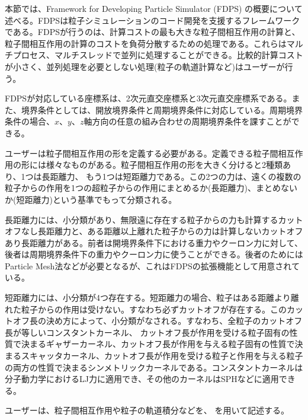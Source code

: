 
本節では、Framework for Developing Particle Simulator (FDPS)
の概要について述べる。FDPSは粒子シミュレーションのコード開発を支援するフレームワークである。FDPSが行うのは、計算コストの最も大きな粒子間相互作用の計算と、粒子間相互作用の計算のコストを負荷分散するための処理である。これらはマルチプロセス、マルチスレッドで並列に処理することができる。比較的計算コストが小さく、並列処理を必要としない処理(粒子の軌道計算など)はユーザーが行う。

FDPSが対応している座標系は、2次元直交座標系と3次元直交座標系である。また、境界条件としては、開放境界条件と周期境界条件に対応している。周期境界条件の場合、$x$、$y$、$z$軸方向の任意の組み合わせの周期境界条件を課すことができる。

ユーザーは粒子間相互作用の形を定義する必要がある。定義できる粒子間相互作用の形には様々なものがある。粒子間相互作用の形を大きく分けると2種類あり、1つは長距離力、 もう1つは短距離力である。この2つの力は、遠くの複数の粒子からの作用を1つの超粒子からの作用にまとめるか(長距離力)、まとめないか(短距離力)という基準でもって分類される。

長距離力には、小分類があり、無限遠に存在する粒子からの力も計算するカットオフなし長距離力と、ある距離以上離れた粒子からの力は計算しないカットオフあり長距離力がある。前者は開境界条件下における重力やクーロン力に対して、後者は周期境界条件下の重力やクーロン力に使うことができる。後者のためにはParticle Mesh法などが必要となるが、これはFDPSの拡張機能として用意されている。

短距離力には、小分類が4つ存在する。短距離力の場合、粒子はある距離より離れた粒子からの作用は受けない。すなわち必ずカットオフが存在する。このカットオフ長の決め方によって、小分類がなされる。すなわち、全粒子のカットオフ長が等しいコンスタントカーネル、 カットオフ長が作用を受ける粒子固有の性質で決まるギャザーカーネル、カットオフ長が作用を与える粒子固有の性質で決まるスキャッタカーネル、カットオフ長が作用を受ける粒子と作用を与える粒子の両方の性質で決まるシンメトリックカーネルである。コンスタントカーネルは分子動力学におけるLJ力に適用でき、その他のカーネルはSPHなどに適用できる。

ユーザーは、粒子間相互作用や粒子の軌道積分などを、
を用いて記述する。